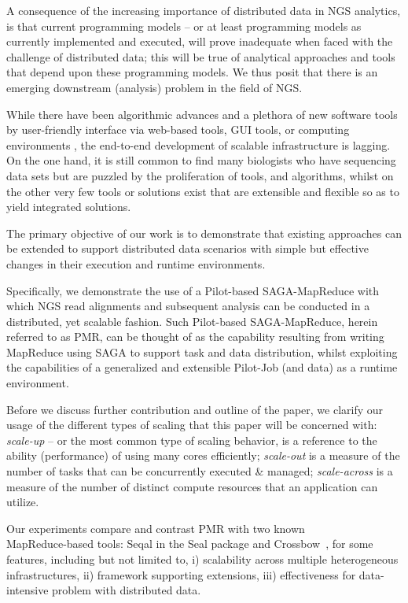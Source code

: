 \documentclass{acm_proc_article-sp}
\begin{document}
A consequence of the increasing importance of distributed data in NGS
analytics, is that current programming models -- or at least
programming models as currently implemented and executed, will prove
inadequate when faced with the challenge of distributed data; this
will be true of analytical approaches and tools that depend upon these
programming models. We thus posit that there is an emerging downstream
(analysis) problem in the field of NGS. 

While there have been algorithmic advances and a plethora of new
software tools by user-friendly interface via web-based tools, GUI
tools, or computing environments \cite{galaxy}, the end-to-end
development of scalable infrastructure is lagging.  On the one hand,
it is still common to find many biologists who have sequencing data
sets but are puzzled by the proliferation of tools, and algorithms,
whilst on the other very few tools or solutions exist that are
extensible and flexible so as to yield integrated solutions.
 
The primary objective of our work is to demonstrate that existing
approaches can be extended to support distributed data scenarios with
simple but effective changes in their execution and runtime
environments.

Specifically, we demonstrate the use of a Pilot-based SAGA-MapReduce
with which NGS read alignments and subsequent analysis can be
conducted in a distributed, yet scalable fashion. Such Pilot-based
SAGA-MapReduce, herein referred to as PMR, can be thought of as the
capability resulting from writing MapReduce using SAGA to support task
and data distribution, whilst exploiting the capabilities of a
generalized and extensible Pilot-Job (and data) as a runtime
environment\cite{Sehgal2011590,pmr2012,pstar11}.

Before we discuss further contribution and outline of the paper, we
clarify our usage of the different types of scaling that this paper
will be concerned with: {\it scale-up} -- or the most common type of
scaling behavior, is a reference to the ability (performance) of using
many cores efficiently; {\it scale-out} is a measure of the number of
tasks that can be concurrently executed \& managed; {\it scale-across}
is a measure of the number of distinct compute resources that an
application can utilize.

Our experiments compare and contrast PMR with two known\\
MapReduce-based tools: Seqal in the Seal package and
Crossbow~\cite{seal2011,langmead2010}, for some features, including
but not limited to, i) scalability across multiple heterogeneous
infrastructures, ii) framework supporting extensions, iii)
effectiveness for data-intensive problem with distributed data.
\end{document}
